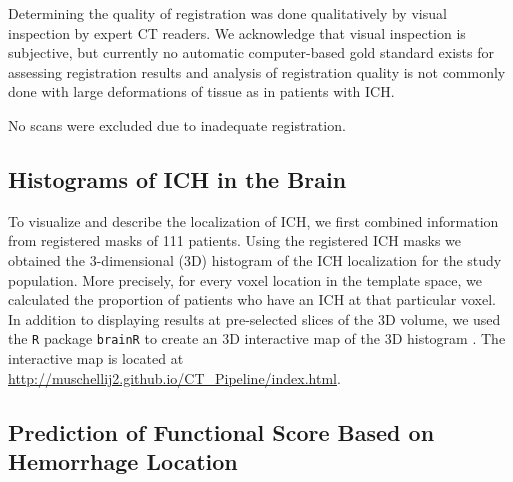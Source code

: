 \documentclass[10pt]{article}\usepackage[]{graphicx}\usepackage[]{color}
\begin{document}
Determining the quality of registration was done qualitatively by visual inspection by expert CT readers.   We acknowledge that visual inspection is subjective, but currently no automatic computer-based gold standard exists for assessing
registration results and analysis of registration quality is not commonly done with large deformations of tissue as in patients with ICH.  

No scans were excluded due to inadequate registration.





\subsection{Histograms of ICH in the Brain}

To visualize and describe the localization of ICH, we first combined information from registered masks of 111 patients.  Using the registered ICH masks we obtained the $3$-dimensional (3D) histogram of the ICH localization for the study population. More precisely, for every voxel location in the template space, we calculated the proportion of patients who have an ICH at that particular voxel.  In addition to displaying results at pre-selected slices of the 3D volume, we used the \verb|R| package \verb|brainR| to create an 3D interactive map of the 3D histogram \citep{brainr}.  The interactive map is located at \url{http://muschellij2.github.io/CT_Pipeline/index.html}.  


\subsection{Prediction of Functional Score Based on Hemorrhage Location}
\end{document}
